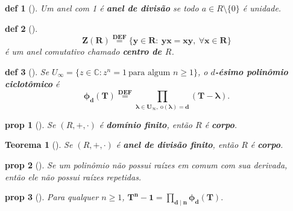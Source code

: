 \documentclass[11pt]{article}
\newcommand{\defname}[1]{\colorbox{yellow!30}{\strut \textbf{#1}}}
\newtheorem*{theorem}{Teorema}
\newtheorem*{proposition}{prop}
\newtheorem*{definition}{def}
\theoremstyle{definition}
\begin{document}
\begin{multicols}{3}
\begin{definition}[\defname{Anel de Divisão}]
Um anel com 1 é \textbf{anel de divisão} se todo \(a\in R\setminus\{0\}\) é unidade.
\end{definition}

\begin{definition}[\defname{Centro do Anel}]
\[
\mathbf{Z(R)\stackrel{\text{DEF}}{=}\{y\in R:\ yx=xy,\ \forall x\in R\}}
\]
é um anel comutativo chamado \textbf{centro de $R$}.
\end{definition}

\begin{definition}[\defname{Polinômio Ciclotômico}]
Se \(U_\infty=\{z\in\mathbb{C}: z^n=1\ \text{para algum }n\ge 1\}\), o \textbf{$d$-ésimo polinômio ciclotômico} é
\[
\mathbf{\phi_d(T)\stackrel{\text{DEF}}{=}\prod_{\lambda\in U_\infty,\ \mathrm{o}(\lambda)=d}(T-\lambda)}.
\]
\end{definition}



\begin{proposition}[\defname{Domínio Finito é Corpo}]
Se \((R,+,\cdot)\) é \textbf{domínio finito}, então \(R\) é \textbf{corpo}.
\end{proposition}

\begin{theorem}[\defname{Wedderburn}]
Se \((R,+,\cdot)\) é \textbf{anel de divisão finito}, então \(R\) é \textbf{corpo}.
\end{theorem}

\begin{proposition}[\defname{Critério da Deri. para Separabilidade}]
Se um polinômio não possui raízes em comum com sua derivada, então ele não possui raízes repetidas.
\end{proposition}

\begin{proposition}[\defname{Fatoração de \(T^n-1\)}]
Para qualquer \(n\ge 1\),
$
\mathbf{T^n-1=\prod_{d\mid n}\phi_d(T)}.
$
\end{proposition}
\end{multicols}
\end{document}
